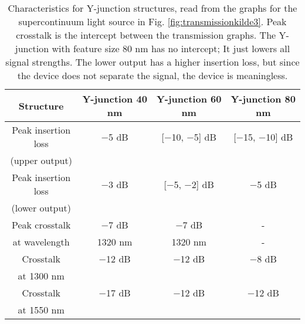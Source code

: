 \begin{table}[h]
\centering
    \begin{tabular}{|c|c|c|c|}
    \hline
    \textbf{Structure}      & \textbf{Y-junction 40 nm} & \textbf{Y-junction 60 nm} & \textbf{Y-junction 80 nm} \\ \hline
    Peak insertion loss & $-$5 dB      & [$-$10, $-$5] dB       & [$-$15, $-$10] dB      \\
    (upper output) & ~          & ~                 & ~                 \\ \hline
    Peak insertion loss & $-$3 dB      & [$-$5, $-$2] dB        &  $-$5 dB            \\
    (lower output) & ~          & ~                 & ~ \\ \hline
    Peak crosstalk & $-$7 dB         & $-$7 dB         & -          \\  
    at wavelength  & 1320 nm   & 1320 nm   & -     \\ \hline
    Crosstalk      & $-$12 dB         & $-$12 dB         & $-$8 dB   \\
    at 1300 nm     & ~         & ~         & ~           \\  \hline
    Crosstalk      & $-$17 dB         & $-$12 dB         & $-$12 dB  \\  
    at 1550 nm & ~         & ~         & ~          \\  \hline
    \end{tabular}
    \caption{Characteristics for Y-junction structures, read from the graphs for the supercontinuum light source in Fig. \ref{fig:transmissionkilde3}. Peak crosstalk is the intercept between the transmission graphs. The Y-junction with feature size 80 nm has no intercept; It just lowers all signal strengths. The lower output has a higher insertion loss, but since the device does not separate the signal, the device is meaningless.}
    \label{table:supercontinuumYjunction}
\end{table}

